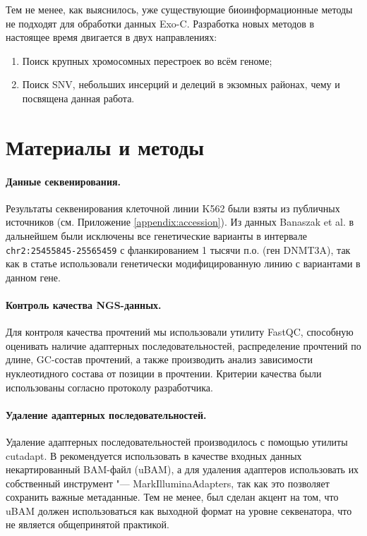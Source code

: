 \documentclass[a4paper,12pt]{article}
\begin{document}
Тем не менее, как выяснилось, уже существующие биоинформационные методы не подходят для обработки данных Exo-C.
Разработка новых методов в настоящее время двигается в двух направлениях:

\begin{enumerate}
\item Поиск крупных хромосомных перестроек во всём геноме\cite{mozheiko};
\item Поиск SNV, небольших инсерций и делеций в экзомных районах, чему и посвящена данная работа.
\end{enumerate}

\section{Материалы и методы}

\paragraph{Данные секвенирования.}
Результаты секвенирования клеточной линии K562 были взяты из публичных источников (см. Приложение \ref{appendix:accession}).
Из данных Banaszak et al. в дальнейшем были исключены все генетические варианты в интервале \verb|chr2:25455845-25565459| с фланкированием 1 тысячи п.о. (ген DNMT3A), так как в статье использовали генетически модифицированную линию с вариантами в данном гене.

\paragraph{Контроль качества NGS-данных.}
Для контроля качества прочтений мы использовали утилиту FastQC\cite{fastqc}, способную оценивать наличие адаптерных последовательностей, распределение прочтений по длине, GC-состав прочтений, а также производить анализ зависимости нуклеотидного состава от позиции в прочтении.
Критерии качества были использованы согласно протоколу разработчика\cite{fastqc}.

\paragraph{Удаление адаптерных последовательностей.}
Удаление адаптерных последовательностей производилось с помощью утилиты cutadapt\cite{cutadapt}.
В \cite{gatk} рекомендуется использовать в качестве входных данных некартированный BAM-файл (uBAM), а для удаления адаптеров использовать их собственный инструмент "--- MarkIlluminaAdapters, так как это позволяет сохранить важные метаданные.
Тем не менее, был сделан акцент на том, что uBAM должен использоваться как выходной формат на уровне секвенатора, что не является общепринятой практикой.
\end{document}
